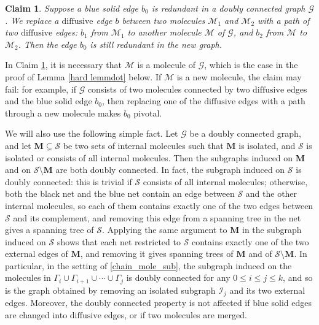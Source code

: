 \documentclass{article}
\newcommand{\1}{\mathds{1}}
\numberwithin{equation}{section}
\renewcommand{\cal}{\mathcal}
\renewcommand{\leq}{\leqslant}
\renewcommand{\le}{\leq}
\newcommand{\dashed}{\text{diffusive}}
\theoremstyle{plain} %
\newtheorem{claim}[theorem]{Claim}
\theoremstyle{remark}
\newcommand{\Pol}{{\mathbf{M}}}
\newcommand{\Iso}{{\mathcal I}}
\begin{document}
\begin{claim}\label{trivial_graph3}
Suppose a blue solid edge $b_0$ is redundant in a doubly connected graph $\cal G$. We replace a $\dashed$ edge $b$ between two molecules $\cal M_1$ and $\cal M_2$ with a path of two $\dashed$ edges: $b_1$ from $\cal M_1$ to another molecule $\cal M$ of $\cal G$, and $b_2$ from $\cal M$ to $\cal M_{2}$. Then the edge $b_0$ is still redundant in the new graph.
\end{claim}
In Claim \ref{trivial_graph3}, it is necessary that $\cal M$ is a molecule of $\cal G$, which is the case in the proof of Lemma \ref{hard lemmdot} below. If $\cal M$ is a new molecule, the claim may fail: for example, if $\cal G$ consists of two molecules connected by two $\dashed$ edges and the blue solid edge $b_0$, then replacing one of the $\dashed$ edges with a path through a new molecule makes $b_0$ pivotal.

We will also use the following simple fact. Let $\cal G$ be a doubly connected graph, and let $\Pol\subsetneq \cal S$ be two sets of internal molecules such that $\Pol$ is isolated, and $\cal S$ is isolated or consists of all internal molecules. Then the subgraphs induced on $\Pol$ and on $\cal S\setminus\Pol$ are both doubly connected. In fact, the subgraph induced on $\cal S$ is doubly connected: this is trivial if $\cal S$ consists of all internal molecules; otherwise, both the black net and the blue net contain an edge between $\cal S$ and the other internal molecules, so each of them contains exactly one of the two edges between $\cal S$ and its complement, and removing this edge from a spanning tree in the net gives a spanning tree of $\cal S$. Applying the same argument to $\Pol$ in the subgraph induced on $\cal S$ shows that each net restricted to $\cal S$ contains exactly one of the two external edges of $\Pol$, and removing it gives spanning trees of $\Pol$ and of $\cal S\setminus\Pol$. In particular, in the setting of \eqref{chain_mole_sub}, the subgraph induced on the molecules in $\Gamma_i\cup \Gamma_{i+1}\cup\cdots \cup\Gamma_j$ is doubly connected for any $0\le i\le j\le k$, and so is the graph obtained by removing an isolated subgraph $\Iso_j$ and its two external edges. Moreover, the doubly connected property is not affected if blue solid edges are changed into $\dashed$ edges, or if two molecules are merged.
\end{document}
